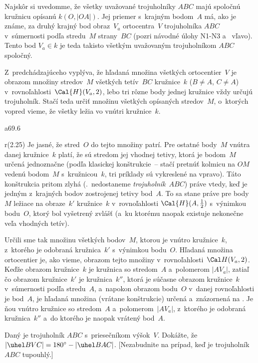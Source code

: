 {%
Najskôr si uvedomme, že všetky uvažované trojuholníky $ABC$ majú spoločnú
kružnicu opísanú $k(O,|OA|)$. Jej priemer s~krajným bodom~$A$ má, ako
je známe, za druhý krajný bod obraz~$V_a$ ortocentra~$V$ trojuholníka $ABC$
v~súmernosti podľa stredu~$M$ strany~$BC$ (pozri návodné úlohy N1-N3
a~\obr{} vľavo). Tento bod $V_a\in k$ je teda takisto všetkým uvažovaným
trojuholníkom $ABC$ spoločný.
%

Z~predchádzajúceho vyplýva, že hľadaná množina všetkých ortocentier~$V$ je obrazom
množiny stredov~$M$ všetkých tetív~$BC$ kružnice~$k$ ($B\ne A$, $C\ne A$) v~rovnoľahlosti~$\Cal{H}(V_a, 2)$, lebo tri rôzne body jednej kružnice vždy určujú trojuholník.
Stačí teda určiť množinu všetkých opísaných stredov~$M$, o~ktorých vopred vieme,
že všetky ležia vo vnútri kružnice~$k$.

\mppic a69.6 \hfil\Obr \par
\inspicture r(2.25)
Je jasné, že stred~$O$ do tejto množiny patrí. Pre ostatné body~$M$
vnútra danej kružnice~$k$ platí, že sú stredom jej vhodnej tetivy,
ktorá je bodom~$M$ určená
jednoznačne (podľa klasickej konštrukcie~-- stačí pretnúť kolmicu
na $OM$ vedenú bodom~$M$ s~kružnicou~$k$, tri
príklady sú vykreslené na  vpravo). Táto konštrukcia pritom zlyhá
(\tj.~nedostaneme {\it trojuholník}~$ABC$)
práve vtedy, keď je jedným z~krajných bodov zostrojenej tetivy bod~$A$. To sa
stane práve pre body~$M$ ležiace na obraze~$k'$ kružnice~$k$ v~rovnoľahlosti $\Cal{H}(A, \frac12)$ s~výnimkou bodu~$O$, ktorý bol
vyšetrený zvlášť (a~ku ktorému naopak existuje nekonečne veľa vhodných tetív).

Určili sme tak množinu všetkých bodov~$M$, ktorou je vnútro kružnice~$k$,
z~ktorého je odobraná kružnica~$k'$ s~výnimkou bodu~$O$. Hľadaná množina ortocentier
je, ako vieme, obrazom tejto množiny v~rovnoľahlosti~$\Cal H(V_a, 2)$.
Keďže obrazom kružnice~$k$ je kružnica so stredom~$A$
a~polomerom $|AV_a|$, zatiaľ čo obrazom kružnice~$k'$ je kružnica~$k''$,
ktorá je súčasne obrazom kružnice~$k$ v~súmernosti podľa
stredu~$A$, a~napokon obrazom bodu~$O$ v~danej rovnoľahlosti je bod~$A$, je
hľadaná množina (vrátane konštrukcie) určená a~znázornená na \obr.
Je ňou vnútro kružnice so stredom~$A$ a~polomerom~$|AV_a|$,
z~ktorého je odobraná kružnica~$k''$ a~do ktorého je naopak vrátený bod~$A$.

Daný je trojuholník $ABC$ s~priesečníkom výšok~$V$. Dokážte, že
$|\uhel BVC| = 180^\circ - |\uhel BAC|$. [Nezabudnite na prípad, keď je
trojuholník $ABC$ tupouhlý.]

}
